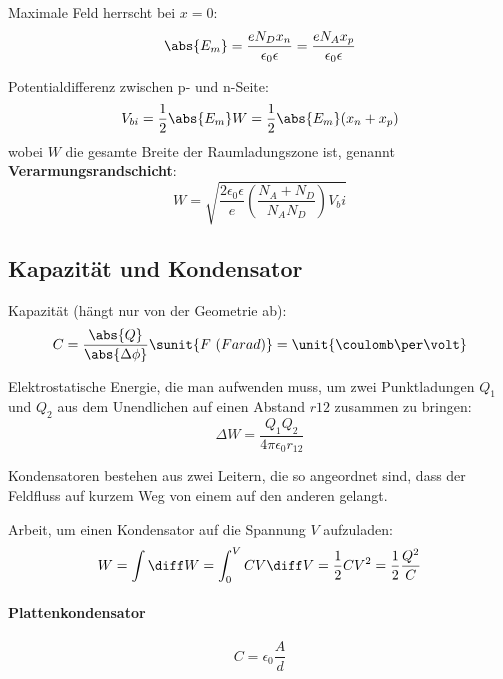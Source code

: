 		Maximale Feld herrscht bei $x=0$:
		\begin{equation*}
			\abs{E_m} = \frac{e N_D x_n}{\epsilon_0 \epsilon} = \frac{e N_A x_p}{\epsilon_0 \epsilon}
		\end{equation*}
		
		Potentialdifferenz zwischen p- und n-Seite:
		\begin{equation*}
			V_{bi} = \frac{1}{2}\abs{E_m} W = \frac{1}{2}\abs{E_m}(x_n+x_p)
		\end{equation*}
		wobei $W$ die gesamte Breite der Raumladungszone ist, genannt \textbf{Verarmungsrandschicht}:
		\begin{equation*}
			W = \sqrt{
				\frac{2\epsilon_0\epsilon}{e} \left(
					\frac{N_A+N_D}{N_A N_D}
				\right) V_bi
			}
		\end{equation*}
	\subsection{Kapazität und Kondensator} %
		Kapazität (hängt nur von der Geometrie ab):
		\begin{equation*}
			C = \frac{\abs{Q}}{\abs{\Delta \phi}} \sunit{F\ (Farad)} = \unit{\coulomb\per\volt}
		\end{equation*}
		
		Elektrostatische Energie, die man aufwenden muss, um zwei Punktladungen
		$Q_1$ und $Q_2$ aus dem Unendlichen auf einen Abstand $r12$ zusammen zu bringen:
		\begin{equation*}
			\Delta W = \frac{Q_1 Q_2}{4\pi\epsilon_0 r_{12}}
		\end{equation*}
		
		Kondensatoren bestehen aus zwei Leitern, die so angeordnet sind, dass der Feldfluss auf kurzem Weg von einem auf den anderen gelangt.
		
		Arbeit, um einen Kondensator auf die Spannung $V$ aufzuladen:
		\begin{equation*}
			W = \int \diff W = \int_0^V C V \diff V = \frac{1}{2} C V^2 = \frac{1}{2} \frac{Q^2}{C}
		\end{equation*}
		
		\paragraph{Plattenkondensator} %
			\begin{equation*}
				C = \epsilon_0 \frac{A}{d}
			\end{equation*}
			

